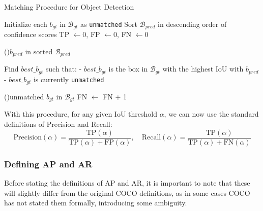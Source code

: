 \begin{algorithm}
    \caption{Matching Procedure for Object Detection}
    \label{alg:matching-procedure}
    \DontPrintSemicolon
    \SetAlgoLined


    \BlankLine
    
    Initialize each $b_{gt}$ in $\mathcal{B}_{gt}$ as \texttt{unmatched}\;
    Sort $\mathcal{B}_{pred}$ in descending order of confidence scores\;
    TP $\gets 0$, FP $\gets 0$, FN $\gets 0$\;
    
    \BlankLine
    
    \ForAll(){$b_{pred}$ \textup{in sorted} $\mathcal{B}_{pred}$}{
        Find $best\_b_{gt}$ such that:\;
        \quad - $best\_b_{gt}$ is the box in $\mathcal{B}_{gt}$ with the highest IoU with $b_{pred}$\;
        \quad - $best\_b_{gt}$ is currently \texttt{unmatched}\;
        
        \BlankLine
        
    }
    
    \BlankLine
    
    \ForAll(){\textup{unmatched} $b_{gt}$ \textup{in} $\mathcal{B}_{gt}$}{
        FN $\gets$ FN + 1\;
    }

    \;

\end{algorithm}With this procedure, for any given IoU threshold $\alpha$, we can now use the standard definitions of Precision and Recall:
\begin{equation}
    \text{Precision}(\alpha) = \frac{\text{TP}(\alpha)}{\text{TP}(\alpha) + \text{FP}(\alpha)}, \quad \text{Recall}(\alpha) = \frac{\text{TP}(\alpha)}{\text{TP}(\alpha) + \text{FN}(\alpha)}
\end{equation}

\subsubsection{Defining AP and AR}
Before stating the definitions of AP and AR, it is important to note that these will slightly differ from the original COCO definitions, as in some cases COCO has not stated them formally, introducing some ambiguity.


